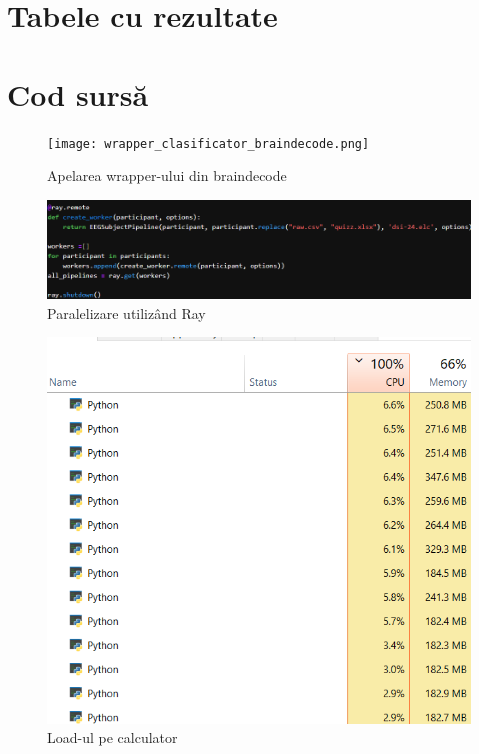 \chapter{Tabele cu rezultate}


\chapter{Cod sursă}

\begin{figure}[h]
    \centering
    \texttt{[image: wrapper\_clasificator\_braindecode.png]}
    \caption{Apelarea wrapper-ului din braindecode}
    \label{fig:wrapper_braindecode}
\end{figure}

\begin{figure}[h]
    \centering
    \includegraphics[width=1\linewidth]{images/ray.png}
    \caption{Paralelizare utilizând Ray}
    \label{fig:paralelizare_ray}
\end{figure}

\begin{figure}[h]
    \centering
    \includegraphics[width=0.7\linewidth]{task_manager.png}
    \caption{Load-ul pe calculator}
    \label{fig:load_calculator}
\end{figure}

